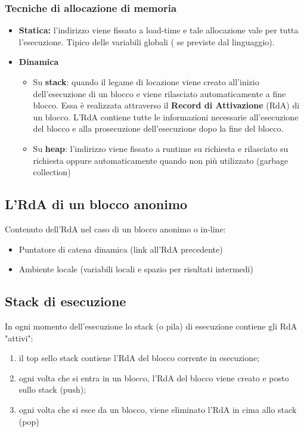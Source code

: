 \documentclass[10pt]{article}
\begin{document}
\subsubsection{Tecniche di allocazione di memoria}
\begin{itemize}
    \item 
    \textbf{Statica:} l'indirizzo viene fissato a load-time e tale allocazione vale per tutta l'esecuzione. Tipico delle variabili globali ( se previste dal linguaggio).
    \item 
    \textbf{Dinamica}
    \begin{itemize}
        \item 
        Su \textbf{stack}: quando il legame di locazione viene creato all'inizio dell'esecuzione di un blocco e viene rilasciato automaticamente a fine blocco. Essa è realizzata attraverso il \textbf{Record di Attivazione} (RdA) di un blocco. L'RdA contiene tutte le informazioni necessarie all'esecuzione del blocco e alla prosecuzione dell'esecuzione dopo la fine del blocco.
        \item 
        Su \textbf{heap}: l'indirizzo viene fissato a runtime su richiesta e rilasciato su richiesta oppure automaticamente quando non più utilizzato (garbage collection)
    \end{itemize} 
\end{itemize}
\subsection{L'RdA di un blocco anonimo}
Contenuto dell'RdA nel caso di un blocco anonimo o in-line:
\begin{itemize}
    \item Puntatore di catena dinamica (link all'RdA precedente)
    \item Ambiente locale (variabili locali e spazio per risultati intermedi)
\end{itemize}
\subsection{Stack di esecuzione}
In ogni momento dell'esecuzione lo stack (o pila) di esecuzione contiene gli RdA "attivi":
\begin{enumerate}
    \item il top sello stack contiene l'RdA del blocco corrente in esecuzione;
    \item ogni volta che si entra in un blocco, l'RdA del blocco viene creato e posto sullo stack (push);
    \item ogni volta che si esce da un blocco, viene eliminato l'RdA in cima allo stack (pop)
\end{enumerate}
\end{document}
